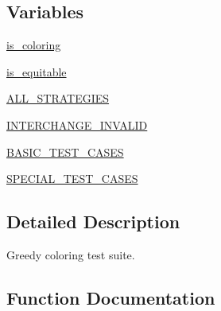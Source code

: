 \subsection*{Variables}
\begin{DoxyCompactItemize}
\item 
\hyperlink{namespacenetworkx_1_1algorithms_1_1coloring_1_1tests_1_1test__coloring_a74e3eedeff23f00c5b85ee86237550fe}{is\+\_\+coloring}
\item 
\hyperlink{namespacenetworkx_1_1algorithms_1_1coloring_1_1tests_1_1test__coloring_ac1a7f89b02bb4837daae8512ea99fee4}{is\+\_\+equitable}
\item 
\hyperlink{namespacenetworkx_1_1algorithms_1_1coloring_1_1tests_1_1test__coloring_a3b48dbf89c91a505785bd802e752ac89}{A\+L\+L\+\_\+\+S\+T\+R\+A\+T\+E\+G\+I\+ES}
\item 
\hyperlink{namespacenetworkx_1_1algorithms_1_1coloring_1_1tests_1_1test__coloring_aa116d6b9a2b9444828c1c30c6448d7f5}{I\+N\+T\+E\+R\+C\+H\+A\+N\+G\+E\+\_\+\+I\+N\+V\+A\+L\+ID}
\item 
\hyperlink{namespacenetworkx_1_1algorithms_1_1coloring_1_1tests_1_1test__coloring_a3baf760681d63b650dd6c85ca664aa8f}{B\+A\+S\+I\+C\+\_\+\+T\+E\+S\+T\+\_\+\+C\+A\+S\+ES}
\item 
\hyperlink{namespacenetworkx_1_1algorithms_1_1coloring_1_1tests_1_1test__coloring_a262b354eefb49ee3a761a846c75b1bdf}{S\+P\+E\+C\+I\+A\+L\+\_\+\+T\+E\+S\+T\+\_\+\+C\+A\+S\+ES}
\end{DoxyCompactItemize}


\subsection{Detailed Description}
\begin{DoxyVerb}Greedy coloring test suite.\end{DoxyVerb}
 

\subsection{Function Documentation}
\mbox{\label{namespacenetworkx_1_1algorithms_1_1coloring_1_1tests_1_1test__coloring_ac2681f98ac86b7c8784fc8cfba8808f2}} 
